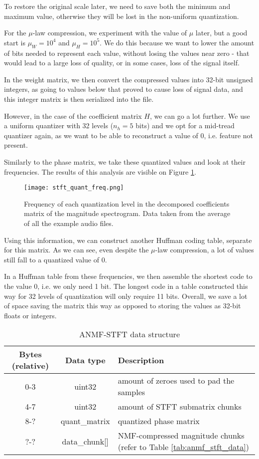 To restore the original scale later, we need to save both the minimum and maximum value, otherwise they will be lost in the non-uniform quantization.

For the $\mu$-law compression, we experiment with the value of $\mu$ later, but a good start is $\mu_W = 10^4$ and $\mu_H = 10^5$. We do this because we want to lower the amount of bits needed to represent each value, without losing the values near zero - that would lead to a large loss of quality, or in some cases, loss of the signal itself.

In the weight matrix, we then convert the compressed values into 32-bit unsigned integers, as going to values below that proved to cause loss of signal data, and this integer matrix is then serialized into the file.

However, in the case of the coefficient matrix $H$, we can go a lot further. We use a uniform quantizer with 32 levels ($n_h = 5$ bits) and we opt for a mid-tread quantizer again, as we want to be able to reconstruct a value of $0$, i.e. feature not present.

Similarly to the phase matrix, we take these quantized values and look at their frequencies. The results of this analysis are visible on Figure \ref{fig:stft_quant_freq}.

\begin{figure}[ht]
	\caption[ANMF-STFT quantized magnitude coefficient frequencies]{Frequency of each quantization level in the decomposed coefficients matrix of the magnitude spectrogram. Data taken from the average of all the example audio files.}
	\label{fig:stft_quant_freq}
	\centering
	\texttt{[image: stft\_quant\_freq.png]}
\end{figure}

Using this information, we can construct another Huffman coding table, separate for this matrix. As we can see, even despite the $\mu$-law compression, a lot of values still fall to a quantized value of $0$.

In a Huffman table from these frequencies, we then assemble the shortest code to the value $0$, i.e. we only need 1 bit. The longest code in a table constructed this way for 32 levels of quantization will only require 11 bits. Overall, we save a lot of space saving the matrix this way as opposed to storing the values as 32-bit floats or integers.

\begin{table}[htbp]\caption{ANMF-STFT data structure}
	\label{tab:anmf_stft_file}
	\centering
	\begin{tabular}{|c|c|l|}
		\hline
		Bytes (relative) & Data type & Description \\ \hline
		0-3 & uint32 & amount of zeroes used to pad the samples \\
		4-7 & uint32 & amount of STFT submatrix chunks \\
		8-? & quant\_matrix & quantized phase matrix \\
		?-? & data\_chunk[] & NMF-compressed magnitude chunks (refer to Table \ref{tab:anmf_stft_data}) \\
		\hline
	\end{tabular}
\end{table}


